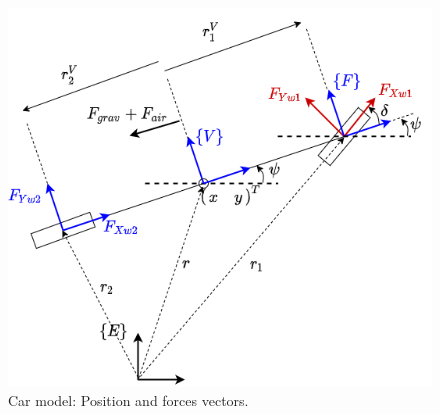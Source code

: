 \documentclass[12pt]{article}
\begin{document}
\begin{figure}[H]
    \centering
    \includegraphics[scale=0.8]{images/car_modelling_forces.png}
    \caption{Car model: Position and forces vectors.}
    \label{fig:car_system_forces}
\end{figure}
\end{document}
